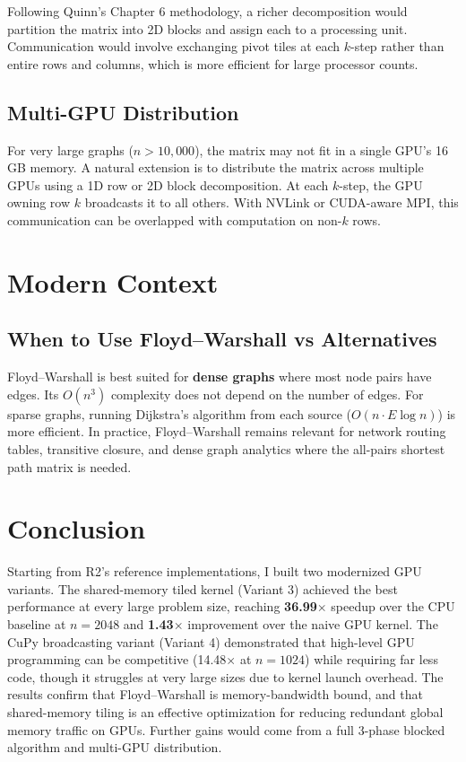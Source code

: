 \documentclass[11pt]{article}
\begin{document}
Following Quinn's Chapter 6 methodology, a richer decomposition would partition the matrix into 2D blocks and assign each to a processing unit. Communication would involve exchanging pivot tiles at each $k$-step rather than entire rows and columns, which is more efficient for large processor counts.

\subsection{Multi-GPU Distribution}

For very large graphs ($n > 10{,}000$), the matrix may not fit in a single GPU's 16 GB memory. A natural extension is to distribute the matrix across multiple GPUs using a 1D row or 2D block decomposition. At each $k$-step, the GPU owning row $k$ broadcasts it to all others. With NVLink or CUDA-aware MPI, this communication can be overlapped with computation on non-$k$ rows.

\section{Modern Context}

\subsection{When to Use Floyd--Warshall vs Alternatives}

Floyd--Warshall is best suited for \textbf{dense graphs} where most node pairs have edges. Its $O(n^3)$ complexity does not depend on the number of edges. For sparse graphs, running Dijkstra's algorithm from each source ($O(n \cdot E \log n)$) is more efficient. In practice, Floyd--Warshall remains relevant for network routing tables, transitive closure, and dense graph analytics where the all-pairs shortest path matrix is needed.

\section{Conclusion}

Starting from R2's reference implementations, I built two modernized GPU variants. The shared-memory tiled kernel (Variant 3) achieved the best performance at every large problem size, reaching \textbf{36.99$\times$} speedup over the CPU baseline at $n = 2048$ and \textbf{1.43$\times$} improvement over the naive GPU kernel. The CuPy broadcasting variant (Variant 4) demonstrated that high-level GPU programming can be competitive (14.48$\times$ at $n = 1024$) while requiring far less code, though it struggles at very large sizes due to kernel launch overhead. The results confirm that Floyd--Warshall is memory-bandwidth bound, and that shared-memory tiling is an effective optimization for reducing redundant global memory traffic on GPUs. Further gains would come from a full 3-phase blocked algorithm and multi-GPU distribution.
\end{document}

